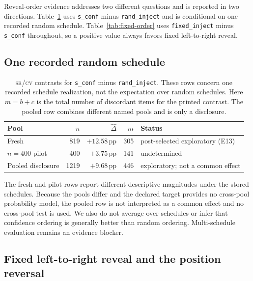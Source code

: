 \documentclass{article}
\newcommand{\sconf}{\texttt{s\_conf}}
\newcommand{\rinj}{\texttt{rand\_inject}}
\newcommand{\finj}{\texttt{fixed\_inject}}
\newcommand{\pp}{\,\mathrm{pp}}
\newcommand{\srcv}{\textsc{sr/cv}}
\begin{document}
Reveal-order evidence addresses two different questions and is reported in
two directions.  Table~\ref{tab:random-order} uses \sconf{} minus \rinj{} and is
conditional on one recorded random schedule.  Table~\ref{tab:fixed-order}
uses \finj{} minus \sconf{} throughout, so a positive value always favors fixed
left-to-right reveal.

\subsection{One recorded random schedule}

\begin{table}[H]
\centering
\small
\setlength{\tabcolsep}{4.3pt}
\caption{\srcv{} contrasts for \sconf{} minus \rinj{}.  These rows concern one
recorded schedule realization, not the expectation over random schedules.
Here $m=b+c$ is the total number of discordant items for the printed contrast.
The pooled row combines different named pools and is only a disclosure.}
\label{tab:random-order}
\begin{tabular}{@{}lrrrl@{}}
\toprule
Pool & $n$ & $\widehat\Delta$ & $m$ & Status \\
\midrule
Fresh & 819 & $+12.58\pp$ & 305 & post-selected exploratory (E13) \\
$n=400$ pilot & 400 & $+3.75\pp$ & 141 & undetermined \\
Pooled disclosure & 1219 & $+9.68\pp$ & 446 & exploratory; not a common effect \\
\bottomrule
\end{tabular}
\end{table}

The fresh and pilot rows report different descriptive magnitudes under the
stored schedules.  Because the pools differ and the declared target provides
no cross-pool probability model, the pooled row is not interpreted as a common
effect and no cross-pool test is used.  We also do not average over schedules
or infer that confidence ordering is generally better than random ordering.
Multi-schedule evaluation remains an evidence blocker.

\subsection{Fixed left-to-right reveal and the position reversal}
\end{document}
